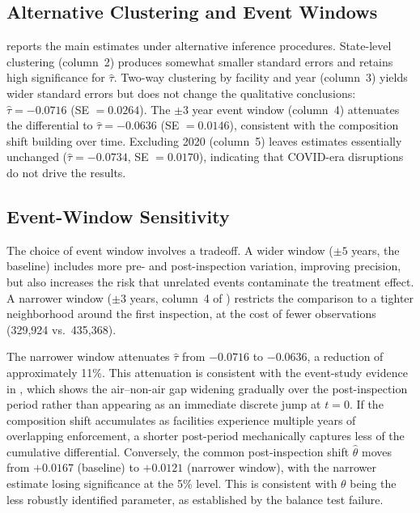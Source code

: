\documentclass[12pt]{article}
\begin{document}
\subsection{Alternative Clustering and Event Windows}

 reports the main estimates under alternative inference procedures. State-level clustering (column~2) produces somewhat smaller standard errors and retains high significance for $\hat{\tau}$. Two-way clustering by facility and year (column~3) yields wider standard errors but does not change the qualitative conclusions: $\hat{\tau} = -0.0716$ (SE $= 0.0264$). The $\pm 3$ year event window (column~4) attenuates the differential to $\hat{\tau} = -0.0636$ (SE $= 0.0146$), consistent with the composition shift building over time. Excluding 2020 (column~5) leaves estimates essentially unchanged ($\hat{\tau} = -0.0734$, SE $= 0.0170$), indicating that COVID-era disruptions do not drive the results.

\subsection{Event-Window Sensitivity}

The choice of event window involves a tradeoff. A wider window ($\pm 5$ years, the baseline) includes more pre- and post-inspection variation, improving precision, but also increases the risk that unrelated events contaminate the treatment effect. A narrower window ($\pm 3$ years, column~4 of ) restricts the comparison to a tighter neighborhood around the first inspection, at the cost of fewer observations (329,924 vs.\ 435,368).

The narrower window attenuates $\hat{\tau}$ from $-0.0716$ to $-0.0636$, a reduction of approximately 11\%. This attenuation is consistent with the event-study evidence in , which shows the air--non-air gap widening gradually over the post-inspection period rather than appearing as an immediate discrete jump at $t = 0$. If the composition shift accumulates as facilities experience multiple years of overlapping enforcement, a shorter post-period mechanically captures less of the cumulative differential. Conversely, the common post-inspection shift $\hat{\theta}$ moves from $+0.0167$ (baseline) to $+0.0121$ (narrower window), with the narrower estimate losing significance at the 5\% level. This is consistent with $\theta$ being the less robustly identified parameter, as established by the balance test failure.
\end{document}
